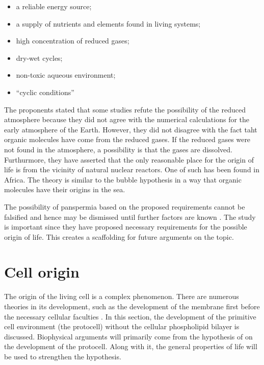 \begin{itemize}
    \item a reliable energy source;
    \item a supply of nutrients and elements found in living systems;
    \item high concentration of reduced gases;
    \item dry-wet cycles;
    \item non-toxic aqueous environment;
    \item ``cyclic conditions''
\end{itemize}

The proponents stated that some studies refute the possibility of the reduced atmosphere because they did not agree with the numerical calculations for the early atmosphere of the Earth.
However, they did not disagree with the fact taht organic molecules have come from the reduced gases.
If the reduced gases were not found in the atmosphere, a possibility is that the gases are dissolved.
Furthurmore, they have asserted that the only reasonable place for the origin of life is from the vicinity of natural nuclear reactors.
One of such has been found in Africa.
The theory is similar to the bubble hypothesis in a way that organic molecules have their origins in the sea.

The possibility of panspermia based on the proposed requirements cannot be falsified and hence may be dismissed until further factors are known \cite{Maruyama2019}.
The study is important since they have proposed necessary requirements for the possible origin of life.
This creates a scaffolding for future arguments on the topic.

\section{Cell origin}
The origin of the living cell is a complex phenomenon.
There are numerous theories in its development, such as the development of the membrane first before the necessary cellular faculties \cite{Matveev2019}.
In this section, the development of the primitive cell environment (the protocell) without the cellular phospholipid bilayer is discussed.
Biophysical arguments will primarily come from the hypothesis of  on the development of the protocell.
Along with it, the general properties of life \cite[p.15]{biomain} will be used to strengthen the hypothesis.

